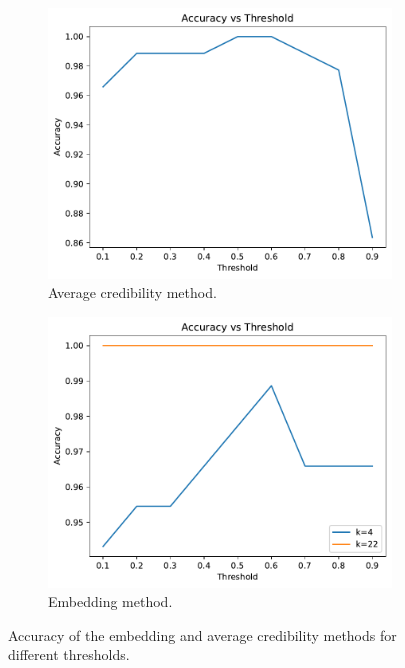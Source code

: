 \begin{figure}[H]
    \centering
    \begin{subfigure}{.5\textwidth}
      \centering
      \includegraphics[width=\linewidth]{obrazky-figures/accuracy_vs_threshold_avg.pdf}
      \caption{Average credibility method.}
      \label{fig:accuracy_vs_logreg}
    \end{subfigure}%
    \begin{subfigure}{.5\textwidth}
      \centering
      \includegraphics[width=\linewidth]{obrazky-figures/accuracy_vs_threshold_logreg.pdf}
      \caption{Embedding method.}
      \label{fig:accuracy_vs_avg}
    \end{subfigure}
    \caption{Accuracy of the embedding and average credibility methods for different thresholds.}
    \label{fig:accuracy_vs_threshold}
\end{figure}


